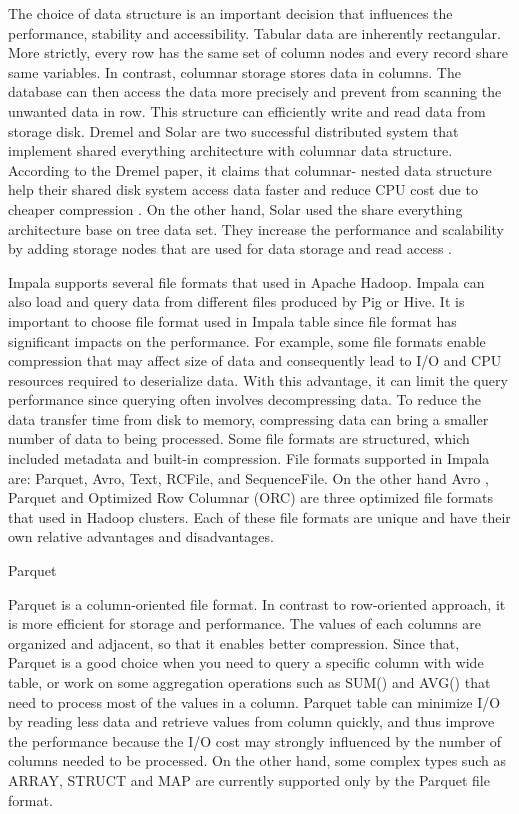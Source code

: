 \documentclass[onecolumn, draftclsnofoot,10pt, compsoc]{IEEEtran}
\begin{document}
The choice of data structure is an important decision that influences the performance, stability and accessibility.
Tabular data are inherently rectangular.
More strictly, every row has the same set of column nodes and every record share same variables.
In contrast, columnar storage stores data in columns.
The database can then access the data more precisely and prevent from scanning the unwanted data in row.
This structure can efficiently write and read data from storage disk.
Dremel and Solar are two successful distributed system that implement shared everything architecture with columnar data structure.
According to the Dremel paper, it claims that columnar- nested data structure help their shared disk system access data faster and reduce CPU cost due to cheaper compression \cite{Dremel}.
On the other hand, Solar used the share everything architecture base on tree data set.
They increase the performance and scalability by adding storage nodes that are used for data storage and read access \cite{zhu2018solar}.  

Impala supports several file formats that used in Apache Hadoop.
Impala can also load and query data from different files produced by Pig or Hive.
It is important to choose file format used in Impala table since file format has significant impacts on the performance.
For example, some file formats enable compression that may affect size of data and consequently lead to I/O and CPU resources required to deserialize data.
With this advantage, it can limit the query performance since querying often involves decompressing data.
To reduce the data transfer time from disk to memory, compressing data can bring a smaller number of data to being processed.
Some file formats are structured, which included metadata and built-in compression.
File formats supported in Impala are: Parquet, Avro, Text, RCFile, and SequenceFile.
On the other hand Avro , Parquet and Optimized Row Columnar (ORC) are three optimized file formats that used in Hadoop clusters.
Each of these file formats are unique and have their own relative advantages and disadvantages.  

Parquet

Parquet is a column-oriented file format. In contrast to row-oriented approach, it is more efficient for storage and performance. The values of each columns are organized and adjacent, so that it enables better compression. Since that, Parquet is a good choice when you need to query a specific column with wide table, or work on some aggregation operations such as SUM() and AVG() that need to process most of the values in a column. Parquet table can minimize I/O by reading less data and retrieve values from column quickly, and thus improve the performance because the I/O cost may strongly  influenced by the number of columns needed to be processed. On the other hand, some complex types such as ARRAY, STRUCT and MAP are currently supported only by the Parquet file format. 
\end{document}
